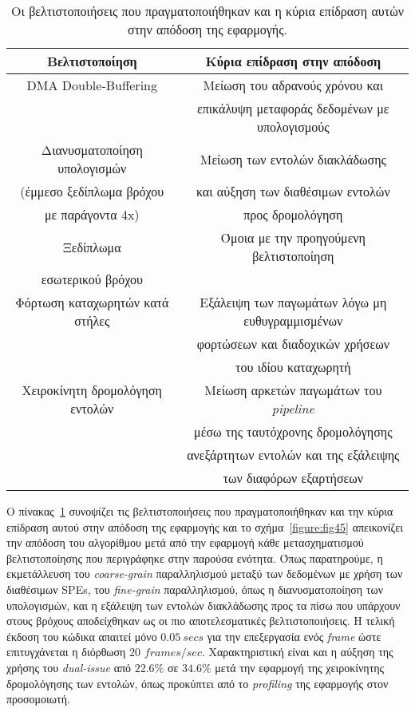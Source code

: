 \begin{table}
\centering
\begin{tabular}{|c|c|}
\hline
Βελτιστοποίηση & Κύρια επίδραση στην απόδοση \\ \hline
DMA Double-Buffering & Μείωση του αδρανούς χρόνου και \\
                     & επικάλυψη μεταφοράς δεδομένων με υπολογισμούς \\ \hline
Διανυσματοποίηση υπολογισμών & Μείωση των εντολών διακλάδωσης \\
(έμμεσο ξεδίπλωμα βρόχου & και αύξηση των διαθέσιμων εντολών\\
με παράγοντα 4x) & προς δρομολόγηση \\ \hline
Ξεδίπλωμα & Όμοια με την προηγούμενη βελτιστοποίηση\\
εσωτερικού βρόχου & \\ \hline
Φόρτωση καταχωρητών κατά στήλες & Εξάλειψη των παγωμάτων λόγω μη ευθυγραμμισμένων \\
                                & φορτώσεων και διαδοχικών χρήσεων \\
                                & του ιδίου καταχωρητή \\ \hline
Χειροκίνητη δρομολόγηση εντολών & Μείωση αρκετών παγωμάτων του \textsl{pipeline} \\
                                & μέσω της ταυτόχρονης δρομολόγησης \\
                                & ανεξάρτητων εντολών και της εξάλειψης \\
                                & των διαφόρων εξαρτήσεων \\ \hline
\end{tabular}
\caption{Οι βελτιστοποιήσεις που πραγματοποιήθηκαν και η κύρια επίδραση αυτών στην απόδοση της εφαρμογής.}
\label{table:tab42}
\end{table}
Ο πίνακας~\ref{table:tab42} συνοψίζει τις βελτιστοποιήσεις που πραγματοποιήθηκαν και την κύρια επίδραση αυτού στην απόδοση της εφαρμογής και το σχήμα~\ref{figure:fig45} απεικονίζει την απόδοση του αλγορίθμου μετά από την εφαρμογή κάθε μετασχηματισμού βελτιστοποίησης που περιγράφηκε στην παρούσα ενότητα. Όπως παρατηρούμε, η εκμετάλλευση του \textsl{coarse-grain} παραλληλισμού μεταξύ των δεδομένων με χρήση των διαθέσιμων \acp{SPE}, του \textsl{fine-grain} παραλληλισμού, όπως η διανυσματοποίηση των υπολογισμών, και η εξάλειψη των εντολών διακλάδωσης προς τα πίσω που υπάρχουν στους βρόχους αποδείχθηκαν ως οι πιο αποτελεσματικές βελτιστοποιήσεις. Η τελική έκδοση του κώδικα απαιτεί μόνο \(0.05\ secs\) για την επεξεργασία ενός \textsl{frame} ώστε επιτυγχάνεται η διόρθωση \(20\) \(frames/sec\). Χαρακτηριστική είναι και η αύξηση της χρήσης του \textsl{dual-issue} από \(22.6\%\) σε \(34.6\%\) μετά την εφαρμογή της χειροκίνητης δρομολόγησης των εντολών, όπως προκύπτει από το \textsl{profiling} της εφαρμογής στον προσομοιωτή.\newline \indent
